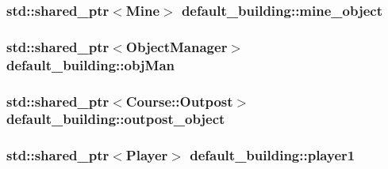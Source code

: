 \hypertarget{classdefault__building_adceff1efd60baeff9af22c161272c67d}{
\subsubsection[{mine\-\_\-object}]{\setlength{\rightskip}{0pt plus 5cm}std\-::shared\-\_\-ptr$<${\bf Mine}$>$ default\-\_\-building\-::mine\-\_\-object\hspace{0.3cm}{\ttfamily [private]}}}\label{classdefault__building_adceff1efd60baeff9af22c161272c67d}
\hypertarget{classdefault__building_a9f19657073191d1ccfae1537bd1bc574}{
\subsubsection[{obj\-Man}]{\setlength{\rightskip}{0pt plus 5cm}std\-::shared\-\_\-ptr$<${\bf Object\-Manager}$>$ default\-\_\-building\-::obj\-Man\hspace{0.3cm}{\ttfamily [private]}}}\label{classdefault__building_a9f19657073191d1ccfae1537bd1bc574}
\hypertarget{classdefault__building_a924c16a0ac49e9b3b9d71d2a27736e93}{
\subsubsection[{outpost\-\_\-object}]{\setlength{\rightskip}{0pt plus 5cm}std\-::shared\-\_\-ptr$<${\bf Course\-::\-Outpost}$>$ default\-\_\-building\-::outpost\-\_\-object\hspace{0.3cm}{\ttfamily [private]}}}\label{classdefault__building_a924c16a0ac49e9b3b9d71d2a27736e93}
\hypertarget{classdefault__building_a0459e600394868e19bb88ababc4e50ae}{
\subsubsection[{player1}]{\setlength{\rightskip}{0pt plus 5cm}std\-::shared\-\_\-ptr$<${\bf Player}$>$ default\-\_\-building\-::player1\hspace{0.3cm}{\ttfamily [private]}}}\label{classdefault__building_a0459e600394868e19bb88ababc4e50ae}
